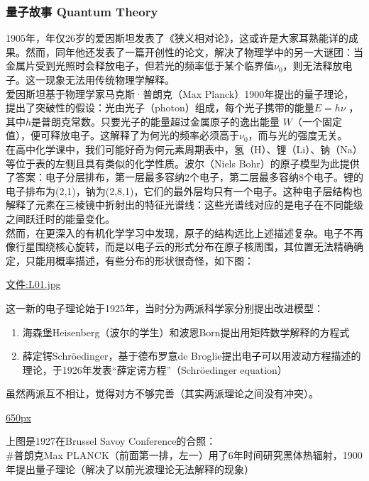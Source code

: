 \hypertarget{ux91cfux5b50ux6545ux4e8b-quantum-theory}{%
\subsubsection{量子故事 Quantum
Theory}\label{ux91cfux5b50ux6545ux4e8b-quantum-theory}}

1905年，年仅26岁的爱因斯坦发表了《狭义相对论》，这或许是大家耳熟能详的成果。然而，同年他还发表了一篇开创性的论文，解决了物理学中的另一大谜团：当金属片受到光照时会释放电子，但若光的频率低于某个临界值\(\nu_0\)，则无法释放电子。这一现象无法用传统物理学解释。\\
爱因斯坦基于物理学家马克斯·普朗克（Max
Planck）1900年提出的量子理论，提出了突破性的假设：光由光子（photon）组成，每个光子携带的能量\(E = h\nu\)
，其中\(h\)是普朗克常数。只要光子的能量超过金属原子的逸出能量
\(W\)（一个固定值），便可释放电子。这解释了为何光的频率必须高于\(\nu_0\)，而与光的强度无关。\\
在高中化学课中，我们可能好奇为何元素周期表中，氢（H）、锂（Li）、钠（Na）等位于表的左侧且具有类似的化学性质。波尔（Niels
Bohr）的原子模型为此提供了答案：电子分层排布，第一层最多容纳2个电子，第二层最多容纳8个电子。锂的电子排布为(2,1)，钠为(2,8,1)，它们的最外层均只有一个电子。这种电子层结构也解释了元素在三棱镜中折射出的特征光谱线：这些光谱线对应的是电子在不同能级之间跃迁时的能量变化。\\
然而，在更深入的有机化学学习中发现，原子的结构远比上述描述复杂。电子不再像行星围绕核心旋转，而是以电子云的形式分布在原子核周围，其位置无法精确确定，只能用概率描述，有些分布的形状很奇怪，如下图：

\url{文件:L01.jpg}

这一新的电子理论始于1925年，当时分为两派科学家分别提出改进模型：

\begin{enumerate}
\tightlist
\item
  海森堡Heisenberg（波尔的学生）和波恩Born提出用矩阵数学解释的方程式
\item
  薛定锷Schröedinger，基于德布罗意de
  Broglie提出电子可以用波动方程描述的理论，于1926年发表``薛定谔方程''（Schröedinger
  equation）\\
\end{enumerate}

虽然两派互不相让，觉得对方不够完善（其实两派理论之间没有冲突）。

\href{文件:科学家们2.jpg}{650px}

上图是1927在Brussel Savoy Conference的合照：\\
\#普朗克Max
PLANCK（前面第一排，左一）用了6年时间研究黑体热辐射，1900年提出量子理论（解决了以前光波理论无法解释的现象）

